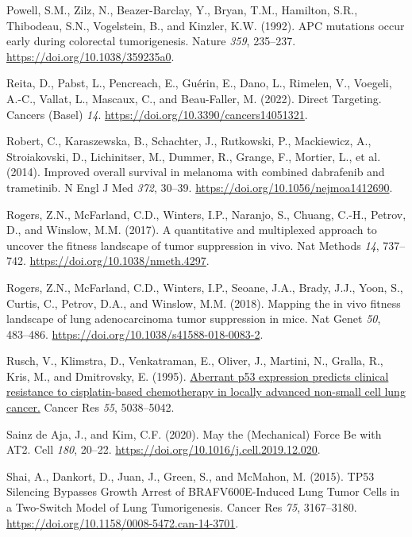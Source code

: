 \begin{CSLReferences}{0}{0}
\leavevmode{}%
Powell, S.M., Zilz, N., Beazer-Barclay, Y., Bryan, T.M., Hamilton, S.R., Thibodeau, S.N., Vogelstein, B., and Kinzler, K.W. (1992). APC mutations occur early during colorectal tumorigenesis. Nature \emph{359}, 235--237. \url{https://doi.org/10.1038/359235a0}.

\leavevmode{}%
Reita, D., Pabst, L., Pencreach, E., Guérin, E., Dano, L., Rimelen, V., Voegeli, A.-C., Vallat, L., Mascaux, C., and Beau-Faller, M. (2022). Direct Targeting. Cancers (Basel) \emph{14}. \url{https://doi.org/10.3390/cancers14051321}.

\leavevmode{}%
Robert, C., Karaszewska, B., Schachter, J., Rutkowski, P., Mackiewicz, A., Stroiakovski, D., Lichinitser, M., Dummer, R., Grange, F., Mortier, L., et al. (2014). Improved overall survival in melanoma with combined dabrafenib and trametinib. N Engl J Med \emph{372}, 30--39. \url{https://doi.org/10.1056/nejmoa1412690}.

\leavevmode{}%
Rogers, Z.N., McFarland, C.D., Winters, I.P., Naranjo, S., Chuang, C.-H., Petrov, D., and Winslow, M.M. (2017). A quantitative and multiplexed approach to uncover the fitness landscape of tumor suppression in vivo. Nat Methods \emph{14}, 737--742. \url{https://doi.org/10.1038/nmeth.4297}.

\leavevmode{}%
Rogers, Z.N., McFarland, C.D., Winters, I.P., Seoane, J.A., Brady, J.J., Yoon, S., Curtis, C., Petrov, D.A., and Winslow, M.M. (2018). Mapping the in vivo fitness landscape of lung adenocarcinoma tumor suppression in mice. Nat Genet \emph{50}, 483--486. \url{https://doi.org/10.1038/s41588-018-0083-2}.

\leavevmode{}%
Rusch, V., Klimstra, D., Venkatraman, E., Oliver, J., Martini, N., Gralla, R., Kris, M., and Dmitrovsky, E. (1995). \href{https://www.ncbi.nlm.nih.gov/pubmed/7585548}{Aberrant p53 expression predicts clinical resistance to cisplatin-based chemotherapy in locally advanced non-small cell lung cancer.} Cancer Res \emph{55}, 5038--5042.

\leavevmode{}%
Sainz de Aja, J., and Kim, C.F. (2020). May the (Mechanical) Force Be with AT2. Cell \emph{180}, 20--22. \url{https://doi.org/10.1016/j.cell.2019.12.020}.

\leavevmode{}%
Shai, A., Dankort, D., Juan, J., Green, S., and McMahon, M. (2015). TP53 Silencing Bypasses Growth Arrest of BRAFV600E-Induced Lung Tumor Cells in a Two-Switch Model of Lung Tumorigenesis. Cancer Res \emph{75}, 3167--3180. \url{https://doi.org/10.1158/0008-5472.can-14-3701}.


\end{CSLReferences}
